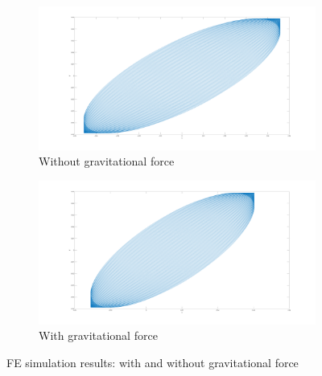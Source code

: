 \documentclass{article}
\begin{document}
\begin{figure}
\centering
    \begin{subfigure}[b]{0.45\textwidth}
        \centering
        \includegraphics[width=\textwidth]{manuscript/figures/FEA_simu_Orbits_No_grav.png}
        \caption{\small{Without gravitational force}}
        \label{fig:fea:simres_nograp}
    \end{subfigure}
    \begin{subfigure}[b]{0.45\textwidth}
        \centering
        \includegraphics[width=\textwidth]{manuscript/figures/FEA_simu_Orbits_With_grav.png}
        \caption{\small{With gravitational force}}
        \label{fig:fea:simres_withgrav}
    \end{subfigure}
\caption{FE simulation results: with and without gravitational force}
    \label{fig:fea:simres_gravitational_force_comparison}
\end{figure}
\end{document}
